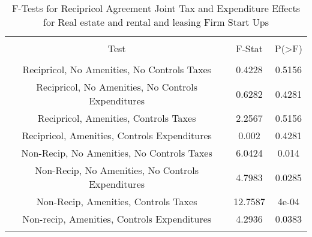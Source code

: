 
\begin{table}[!htbp] \centering 
  \caption{F-Tests for Recipricol Agreement Joint Tax and Expenditure Effects for Real estate and rental and leasing Firm Start Ups} 
  \label{53Ftests} 
\begin{tabular}{@{\extracolsep{5pt}} ccc} 
\\[-1.8ex]\hline 
\hline \\[-1.8ex] 
Test & F-Stat & P(\textgreater F) \\ 
\hline \\[-1.8ex] 
Recipricol, No Amenities, No Controls Taxes & 0.4228 & 0.5156 \\ 
Recipricol, No Amenities, No Controls Expenditures & 0.6282 & 0.4281 \\ 
Recipricol, Amenities, Controls Taxes & 2.2567 & 0.5156 \\ 
Recipricol, Amenities, Controls Expenditures & 0.002 & 0.4281 \\ 
Non-Recip, No Amenities, No Controls Taxes & 6.0424 & 0.014 \\ 
Non-Recip, No Amenities, No Controls Expenditures & 4.7983 & 0.0285 \\ 
Non-Recip, Amenities, Controls Taxes & 12.7587 & 4e-04 \\ 
Non-recip, Amenities, Controls Expenditures & 4.2936 & 0.0383 \\ 
\hline \\[-1.8ex] 
\end{tabular} 
\end{table} 

